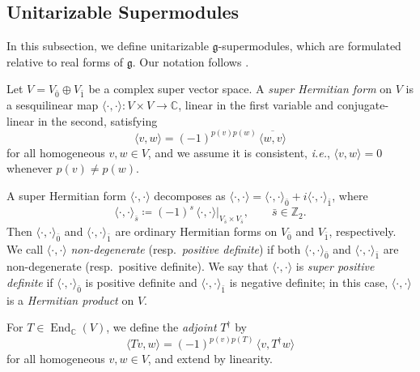 \documentclass[11pt]{amsart}
\newcommand{\bracket}{{\langle \cdot,\cdot \rangle}}
\newcommand{\End}{\operatorname{End}}
\def\CC{{\mathbb C}}
\def\bra{{\langle}}
\def\ket{{\rangle}}
\def\gg{{\mathfrak{g}}}
\def\ZZ{{\mathbb Z}}
\theoremstyle{plain}
\theoremstyle{remark}
\theoremstyle{definition}
\numberwithin{equation}{section}
\theoremstyle{remark}
\begin{document}
\subsection{Unitarizable Supermodules} \label{subsec::unitarizable_supermodules}

In this subsection, we define unitarizable $\gg$-supermodules, which are formulated relative to real forms of $\gg$. Our notation follows
\cite{Carmeli_Fioresi_Varadarajan_HW,Chuah_Fioresi_real,Fioresi_real_forms}.

Let $V=V_{\bar 0}\oplus V_{\bar 1}$ be a complex super vector space. A \emph{super Hermitian form} on $V$ is a sesquilinear map
$\bracket:V\times V\to\CC$, linear in the first variable and conjugate-linear in the second, satisfying
\begin{equation}
 \bra v,w\ket=(-1)^{p(v)p(w)}\,\overline{\bra w,v\ket}
\end{equation}
for all homogeneous $v,w\in V$, and we assume it is consistent, \emph{i.e.}, $\bra v,w\ket=0$ whenever $p(v)\neq p(w)$.

A super Hermitian form $\bracket$ decomposes as $\bracket=\bracket_{\bar{0}}+i\bracket_{\bar{1}}$, where
\begin{equation}
 \bracket_{\bar{s}}\coloneqq (-1)^s\,\bracket|_{V_{\bar s}\times V_{\bar s}},\qquad \bar{s}\in\ZZ_2.
\end{equation}
Then $\bracket_{\bar{0}}$ and $\bracket_{\bar{1}}$ are ordinary Hermitian forms on $V_{\bar 0}$ and $V_{\bar 1}$, respectively. We call $\bracket$
\emph{non-degenerate} (resp.\ \emph{positive definite}) if both $\bracket_{\bar{0}}$ and $\bracket_{\bar{1}}$ are non-degenerate (resp.\ positive definite).
We say that $\bracket$ is \emph{super positive definite} if $\bracket_{\bar{0}}$ is positive definite and $\bracket_{\bar{1}}$ is negative definite; in this case,
$\bracket$ is a \emph{Hermitian product} on $V$.

For $T\in\End_{\CC}(V)$, we define the \emph{adjoint} $T^{\dagger}$ by
\begin{equation}
 \bra Tv,w\ket=(-1)^{p(v)p(T)}\,\bra v,T^{\dagger}w\ket
\end{equation}
for all homogeneous $v,w\in V$, and extend by linearity.
\end{document}
